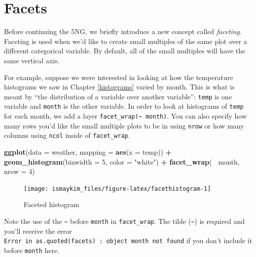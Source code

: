 \documentclass[12pt,]{krantz}
\makeatletter
\newenvironment{Shaded}{\begin{snugshade}}{\end{snugshade}}
\newcommand{\KeywordTok}[1]{\textcolor[rgb]{0.27,0.27,0.27}{\textbf{#1}}}
\newcommand{\DataTypeTok}[1]{\textcolor[rgb]{0.27,0.27,0.27}{#1}}
\newcommand{\DecValTok}[1]{\textcolor[rgb]{0.06,0.06,0.06}{#1}}
\newcommand{\StringTok}[1]{\textcolor[rgb]{0.5,0.5,0.5}{#1}}
\newcommand{\OperatorTok}[1]{\textcolor[rgb]{0.43,0.43,0.43}{\textbf{#1}}}
\newcommand{\NormalTok}[1]{#1}
\newenvironment{kframe}{%
\medskip{}
\setlength{\fboxsep}{.8em}
 \def\at@end@of@kframe{}%
 \ifinner\ifhmode%
  \def\at@end@of@kframe{\end{minipage}}%
  \begin{minipage}{\columnwidth}%
 \fi\fi%
 \def\FrameCommand##1{\hskip\@totalleftmargin \hskip-\fboxsep
 \colorbox{shadecolor}{##1}\hskip-\fboxsep
     \hskip-\linewidth \hskip-\@totalleftmargin \hskip\columnwidth}%
 \MakeFramed {\advance\hsize-\width
   \@totalleftmargin\z@ \linewidth\hsize
   \@setminipage}}%
 {\par\unskip\endMakeFramed%
 \at@end@of@kframe}
\renewenvironment{Shaded}{\begin{kframe}}{\end{kframe}}
\theoremstyle{definition}
\theoremstyle{definition}
\theoremstyle{definition}
\theoremstyle{remark}
\makeatother
\begin{document}
\section{Facets}\label{facets}

Before continuing the 5NG, we briefly introduce a new concept called
\emph{faceting}. Faceting is used when we'd like to create small
multiples of the same plot over a different categorical variable. By
default, all of the small multiples will have the same vertical axis.

For example, suppose we were interested in looking at how the
temperature histograms we saw in Chapter \ref{histograms} varied by
month. This is what is meant by ``the distribution of a variable over
another variable'': \texttt{temp} is one variable and \texttt{month} is
the other variable. In order to look at histograms of \texttt{temp} for
each month, we add a layer
\texttt{facet\_wrap(\textasciitilde{}\ month)}. You can also specify how
many rows you'd like the small multiple plots to be in using
\texttt{nrow} or how many columns using \texttt{ncol} inside of
\texttt{facet\_wrap}.

\begin{Shaded}
\begin{Highlighting}[]
\KeywordTok{ggplot}\NormalTok{(}\DataTypeTok{data =}\NormalTok{ weather, }\DataTypeTok{mapping =} \KeywordTok{aes}\NormalTok{(}\DataTypeTok{x =}\NormalTok{ temp)) }\OperatorTok{+}
\StringTok{  }\KeywordTok{geom_histogram}\NormalTok{(}\DataTypeTok{binwidth =} \DecValTok{5}\NormalTok{, }\DataTypeTok{color =} \StringTok{"white"}\NormalTok{) }\OperatorTok{+}
\StringTok{  }\KeywordTok{facet_wrap}\NormalTok{(}\OperatorTok{~}\StringTok{ }\NormalTok{month, }\DataTypeTok{nrow =} \DecValTok{4}\NormalTok{)}
\end{Highlighting}
\end{Shaded}

\begin{figure}

{\centering \texttt{[image: ismaykim\_files/figure-latex/facethistogram-1]} 

}

\caption{Faceted histogram}\label{fig:facethistogram}
\end{figure}

Note the use of the \texttt{\textasciitilde{}} before \texttt{month} in
\texttt{facet\_wrap}. The tilde (\texttt{\textasciitilde{}}) is required
and you'll receive the error
\texttt{Error\ in\ as.quoted(facets)\ :\ object\ \textquotesingle{}month\textquotesingle{}\ not\ found}
if you don't include it before \texttt{month} here.
\end{document}
